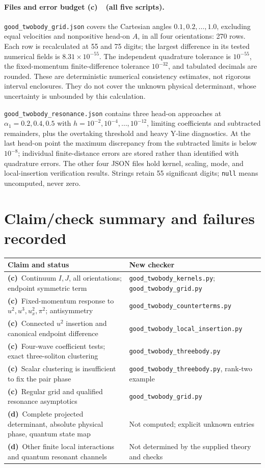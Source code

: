 \documentclass[11pt,a4paper]{article}
\newcommand{\Cc}{\textbf{(c)}\ }
\newcommand{\Cd}{\textbf{(d)}\ }
\newcommand{\file}[1]{\nolinkurl{#1}}
\newcommand{\kernels}{\file{good_twobody_kernels.py}}
\newcommand{\ct}{\file{good_twobody_counterterms.py}}
\newcommand{\three}{\file{good_twobody_threebody.py}}
\newcommand{\grid}{\file{good_twobody_grid.py}}
\newcommand{\insertcheck}{\file{good_twobody_local_insertion.py}}
\begin{document}
\paragraph{Files and error budget \Cc\ (all five scripts).}
\file{good_twobody_grid.json} covers the Cartesian angles
\(0.1,0.2,\ldots,1.0\), excluding equal velocities and nonpositive
head-on \(A\), in all four orientations: 270 rows.
Each row is recalculated at 55 and 75 digits; the largest difference
in its tested numerical fields is \(8.31\times10^{-55}\).
The independent quadrature tolerance is \(10^{-55}\), the fixed-momentum
finite-difference tolerance \(10^{-32}\), and tabulated decimals are
rounded. These are deterministic numerical consistency estimates, not
rigorous interval enclosures. They do not cover the unknown physical
determinant, whose uncertainty is unbounded by this calculation.

\file{good_twobody_resonance.json} contains three head-on approaches
at \(\alpha_1=0.2,0.4,0.5\) with
\(h=10^{-2},10^{-4},\ldots,10^{-12}\), limiting coefficients and
subtracted remainders, plus the overtaking threshold and heavy Y-line
diagnostics. At the last head-on point the maximum discrepancy from the
subtracted limits is below \(10^{-8}\); individual finite-distance
errors are stored rather than identified with quadrature errors.
The other four JSON files hold kernel, scaling, mode, and local-insertion
verification results. Strings retain 55 significant digits; \texttt{null}
means uncomputed, never zero.

\clearpage
\section{Claim/check summary and failures recorded}
\small
\begin{longtable}{@{}>{\raggedright\arraybackslash}p{8cm}>{\raggedright\arraybackslash}p{6.4cm}@{}}\toprule
Claim and status & New checker\\\midrule\endhead
\Cc Continuum $I,J$, all orientations; endpoint symmetric term & \kernels; \grid\\
\Cc Fixed-momentum response to $u^2,u^3,u_x^2,\pi^2$; antisymmetry & \ct\\
\Cc Connected $u^2$ insertion and canonical endpoint difference & \insertcheck\\
\Cc Four-wave coefficient tests; exact three-soliton clustering & \three\\
\Cc Scalar clustering is insufficient to fix the pair phase & \three, rank-two example\\
\Cc Regular grid and qualified resonance asymptotics & \grid\\
\Cd Complete projected determinant, absolute physical phase, quantum state map & Not computed; explicit unknown entries\\
\Cd Other finite local interactions and quantum resonant channels & Not determined by the supplied theory and checks\\\bottomrule
\end{longtable}
\normalsize
\end{document}

